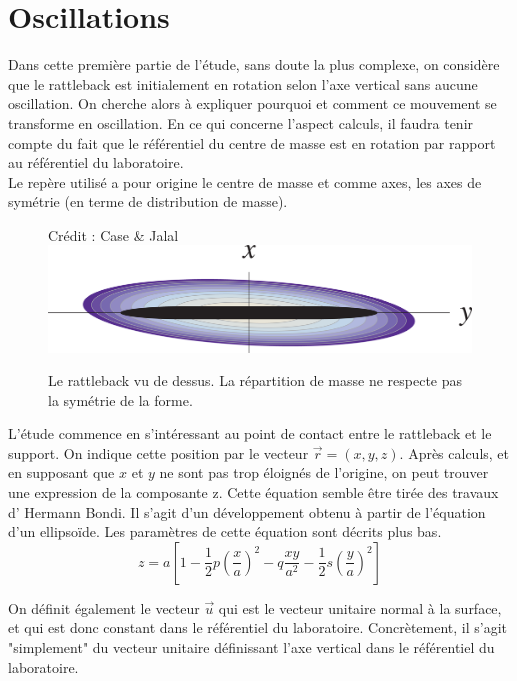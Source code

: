 \documentclass[12pt,a4paper]{article}
\begin{document}
	\section{Oscillations}
	Dans cette première partie de l'étude, sans doute la plus complexe, on considère que le rattleback est initialement en rotation selon l'axe vertical sans aucune oscillation. On cherche alors à expliquer pourquoi et comment ce mouvement se transforme en oscillation.
	En ce qui concerne l'aspect calculs, il faudra tenir compte du fait que le référentiel du centre de masse est en rotation par rapport au référentiel du laboratoire.\\
	Le repère utilisé a pour origine le centre de masse et comme axes, les axes de symétrie (en terme de distribution de masse).\\
	\begin{figure}[h]
		\centering
		\caption{Le rattleback vu de dessus. La répartition de masse ne respecte pas la symétrie de la forme.}{Crédit : Case \& Jalal}
		\label{fig:mass-repartition}
		\includegraphics[width=0.7\linewidth]{"mass repartition"}
	\end{figure}
	
	L'étude commence en s'intéressant au point de contact entre le rattleback et le support. On indique cette position par le vecteur $\vec{r}=(x,y,z)$. Après calculs, et en supposant que $x$ et $y$ ne sont pas trop éloignés de l'origine, on peut trouver une expression de la composante z.
	Cette équation semble être tirée des travaux d' Hermann Bondi. Il s'agit d'un développement obtenu à partir de l'équation d'un ellipsoïde. Les paramètres de cette équation sont décrits plus bas. 
	\begin{equation}
	z=a\left[ 1-\dfrac {1} {2}p\left( \dfrac {x} {a}\right) ^{2}-q\dfrac {xy} {a^{2}}-\dfrac {1} {2}s\left( \dfrac {y} {a}\right) ^{2}\right]
	\label{eq:z}
	\end{equation}
	
	On définit également le vecteur $\vec{u}$ qui est le vecteur unitaire normal à la surface, et qui est donc constant dans le référentiel du laboratoire. Concrètement, il s'agit "simplement" du vecteur unitaire définissant l'axe vertical dans le référentiel du laboratoire.\\
	
\end{document}
